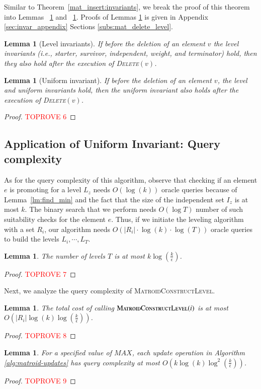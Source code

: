 \documentclass[11pt]{article}
\newtheorem{lemma}[theorem]{Lemma}
\newcommand{\mO}{O}
\newcommand{\MatroidConstLevel}{\textsc{MatroidConstructLevel}}
\newcommand{\deletev}{{\textsc{Delete}}}
\begin{document}
Similar to Theorem~\ref{mat_insert:invariants}, we break the proof of this theorem into 
Lemmas ~\ref{mat_delete_level} and ~\ref{mat_delete_uni}. Proofs of Lemmas \ref{mat_delete_level} is given in Appendix \ref{sec:invar_appendix} Sections \ref{subs:mat_delete_level}.


\begin{lemma}[Level invariants]
\label{mat_delete_level}
If before the deletion of an element $v$ the level invariants (i.e., starter, survivor, independent, weight, and terminator) hold, 
then they also hold after the execution of \deletev$(v)$. 
\end{lemma}

\begin{lemma} [Uniform invariant]
\label{mat_delete_uni}
If before the deletion of an element $v$, the level and uniform invariants hold, then the uniform invariant also holds after the execution of \deletev$(v)$. 
\end{lemma}


\begin{proof}\textcolor{red}{TOPROVE 6}\end{proof}




\subsection{Application of Uniform Invariant: Query complexity}
As for the query complexity of this algorithm, 
observe that checking if an element $e$ is promoting  for a level $L_{z}$ 
needs $O(\log(k))$ oracle queries 
because of Lemma~\ref{lm:find_min} and the fact that the size of the independent set $I_z$ is at most $k$.
The binary search that we perform needs $O(\log T)$ number of such suitability checks for the element $e$. 
Thus, if we initiate the leveling algorithm with a set $R_i$, 
our algorithm needs $O(|R_i|\cdot \log(k) \cdot \log(T))$ oracle queries to build the levels $L_i,\cdots, L_T$. 

\begin{lemma}
\label{lm:number_of_levels}
  The number of levels $T$ is at most $k\log(\frac{k}{\epsilon})$.
\end{lemma}
\begin{proof}\textcolor{red}{TOPROVE 7}\end{proof}

Next, we analyze the query complexity
of \MatroidConstLevel{}. 
\begin{lemma}
\label{lm:level_query_complexity}
  The total cost of calling $\MatroidConstLevel{}(i)$ is at most
  $\mO\left(|R_i|\log(k)\log\left(\frac{k}{\epsilon}\right)\right)$.
\end{lemma}
\begin{proof}\textcolor{red}{TOPROVE 8}\end{proof}
\begin{lemma}
  For a specified value of $MAX$, each update operation in Algorithm \ref{alg:matroid-updates} has query complexity at most
  $\mO\left(k\log(k)\log^2\left(\frac{k}{\epsilon}\right)\right)$.
\end{lemma}
\begin{proof}\textcolor{red}{TOPROVE 9}\end{proof}
\end{document}
